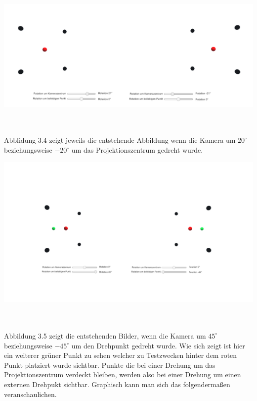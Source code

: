 \begin{minipage}{\linewidth}
	\centering
	\includegraphics[width=1.\linewidth]{images/DrehungPZ.png}
\end{minipage}\\ \\

Abblidung 3.4 zeigt jeweils die entstehende Abbildung wenn die Kamera um \ensuremath{20^\circ} beziehungsweise \ensuremath{-20^\circ} um das Projektionszentrum gedreht wurde.

\begin{minipage}{\linewidth}
	\centering
	\includegraphics[width=1.\linewidth]{images/DrehungDZ.png}
\end{minipage}\\ \\

Abbildung 3.5 zeigt die entstehenden Bilder, wenn die Kamera um \ensuremath{45^\circ} beziehungsweise \ensuremath{-45^\circ} um den Drehpunkt gedreht wurde. Wie sich zeigt ist hier ein weiterer grüner Punkt zu sehen welcher zu Testzwecken hinter dem roten Punkt platziert wurde sichtbar. Punkte die bei einer Drehung um das Projektionszentrum verdeckt bleiben, werden also bei einer Drehung um einen externen Drehpukt sichtbar. Graphisch kann man sich das folgendermaßen veranschaulichen.

